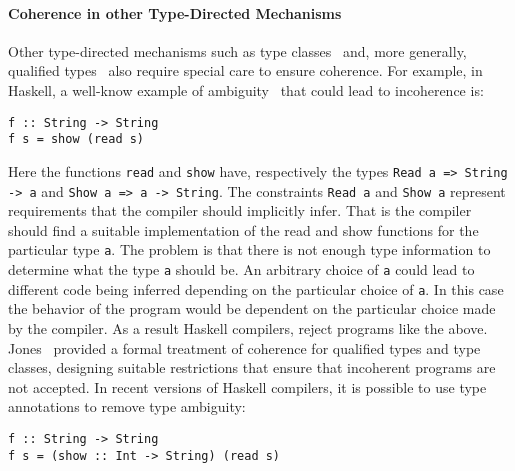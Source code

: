 \begin{comment}
As an alternative to syntactic subtyping described in this paper,
Frisch~\textit{et al.}~\cite{frisch2008semantic} studied semantic subtyping. Semantic
subtyping attempts to increase the expressive power of the 

seems to have important advantages over syntactic subtyping. One
worthy avenue for future work is to study languages with intersection types
and merge operator in a semantic subtyping setting.
\end{comment}

\paragraph{Coherence in other Type-Directed Mechanisms} Other
type-directed mechanisms such as type classes~\cite{Wadler89ad-hoc} and, more generally, 
qualified types~\cite{jones94} also require special care to ensure coherence.
For example, in Haskell, a well-know example of ambiguity~\cite{Mark93coherence} that could
lead to incoherence is:

\begin{verbatim}
f :: String -> String
f s = show (read s)
\end{verbatim}

\noindent Here the functions \verb|read| and \verb|show| have,
respectively the types \verb|Read a => String -> a| and 
\verb|Show a => a -> String|. The constraints \verb|Read a| 
and \verb|Show a| represent requirements that the compiler 
should implicitly infer. That is the compiler should find a suitable 
implementation of the read and show functions for the particular type 
\verb|a|. The problem is that there is not enough type information 
to determine what the type \verb|a| should be. 
An arbitrary choice 
of \verb|a| could lead to different code being inferred depending on
the particular choice of \verb|a|. In this case the behavior of the program would be dependent on the particular
choice made by the compiler. As a result Haskell compilers, reject 
programs like the above. Jones~\cite{Mark93coherence} provided a
formal treatment of coherence for qualified types and type classes,
designing suitable restrictions that ensure that incoherent programs 
are not accepted. In recent versions of Haskell compilers, it is possible to use 
type annotations to remove type ambiguity:

\begin{verbatim}
f :: String -> String
f s = (show :: Int -> String) (read s)
\end{verbatim}


